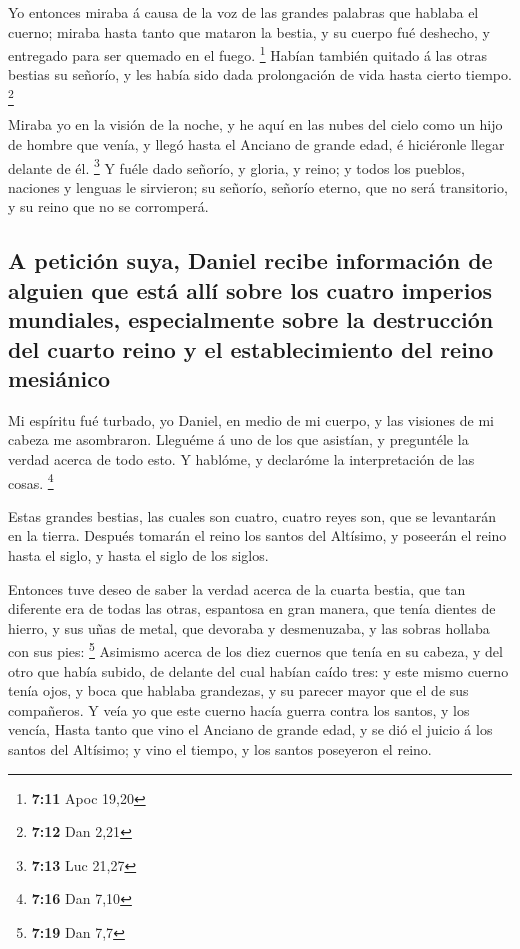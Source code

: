  Yo entonces miraba á causa de la voz de las grandes
palabras que hablaba el cuerno; miraba hasta tanto que mataron la
bestia, y su cuerpo fué deshecho, y entregado para ser quemado en el
fuego. \footnote{\textbf{7:11} Apoc 19,20}  Habían también
quitado á las otras bestias su señorío, y les había sido dada
prolongación de vida hasta cierto tiempo. \footnote{\textbf{7:12} Dan
  2,21}

 Miraba yo en la visión de la noche, y he aquí en las nubes
del cielo como un hijo de hombre que venía, y llegó hasta el Anciano de
grande edad, é hiciéronle llegar delante de él. \footnote{\textbf{7:13}
  Luc 21,27}  Y fuéle dado señorío, y gloria, y reino; y
todos los pueblos, naciones y lenguas le sirvieron; su señorío, señorío
eterno, que no será transitorio, y su reino que no se corromperá.

\hypertarget{a-peticiuxf3n-suya-daniel-recibe-informaciuxf3n-de-alguien-que-estuxe1-alluxed-sobre-los-cuatro-imperios-mundiales-especialmente-sobre-la-destrucciuxf3n-del-cuarto-reino-y-el-establecimiento-del-reino-mesiuxe1nico}{%
\subsection{A petición suya, Daniel recibe información de alguien que
está allí sobre los cuatro imperios mundiales, especialmente sobre la
destrucción del cuarto reino y el establecimiento del reino
mesiánico}\label{a-peticiuxf3n-suya-daniel-recibe-informaciuxf3n-de-alguien-que-estuxe1-alluxed-sobre-los-cuatro-imperios-mundiales-especialmente-sobre-la-destrucciuxf3n-del-cuarto-reino-y-el-establecimiento-del-reino-mesiuxe1nico}}

 Mi espíritu fué turbado, yo Daniel, en medio de mi cuerpo,
y las visiones de mi cabeza me asombraron.  Lleguéme á uno
de los que asistían, y preguntéle la verdad acerca de todo esto. Y
hablóme, y declaróme la interpretación de las cosas. \footnote{\textbf{7:16}
  Dan 7,10}

 Estas grandes bestias, las cuales son cuatro, cuatro reyes
son, que se levantarán en la tierra.  Después tomarán el
reino los santos del Altísimo, y poseerán el reino hasta el siglo, y
hasta el siglo de los siglos.

 Entonces tuve deseo de saber la verdad acerca de la cuarta
bestia, que tan diferente era de todas las otras, espantosa en gran
manera, que tenía dientes de hierro, y sus uñas de metal, que devoraba y
desmenuzaba, y las sobras hollaba con sus pies: \footnote{\textbf{7:19}
  Dan 7,7}  Asimismo acerca de los diez cuernos que tenía
en su cabeza, y del otro que había subido, de delante del cual habían
caído tres: y este mismo cuerno tenía ojos, y boca que hablaba
grandezas, y su parecer mayor que el de sus compañeros.  Y
veía yo que este cuerno hacía guerra contra los santos, y los vencía,
 Hasta tanto que vino el Anciano de grande edad, y se dió
el juicio á los santos del Altísimo; y vino el tiempo, y los santos
poseyeron el reino.

